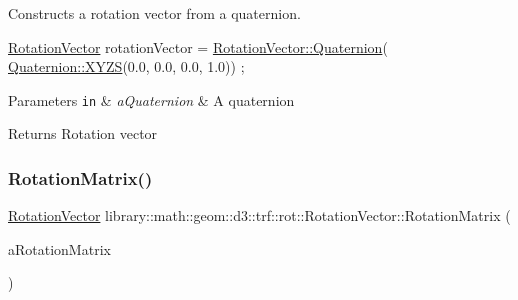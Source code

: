 Constructs a rotation vector from a quaternion. 


\begin{DoxyCode}
\hyperlink{classlibrary_1_1math_1_1geom_1_1d3_1_1trf_1_1rot_1_1_rotation_vector_a49076a279f457fdb14c4a9d4d61e1738}{RotationVector} rotationVector = \hyperlink{classlibrary_1_1math_1_1geom_1_1d3_1_1trf_1_1rot_1_1_rotation_vector_a6da4ed18679e28816896de413e04ed79}{RotationVector::Quaternion}(
      \hyperlink{classlibrary_1_1math_1_1geom_1_1d3_1_1trf_1_1rot_1_1_quaternion_a006294eb483bcfc352c2dc36cf19ceec}{Quaternion::XYZS}(0.0, 0.0, 0.0, 1.0)) ;
\end{DoxyCode}



\begin{DoxyParams}[1]{Parameters}
\mbox{\tt in}  & {\em a\+Quaternion} & A quaternion \\
\hline
\end{DoxyParams}
\begin{DoxyReturn}{Returns}
Rotation vector 
\end{DoxyReturn}
\mbox{\label{classlibrary_1_1math_1_1geom_1_1d3_1_1trf_1_1rot_1_1_rotation_vector_a397807ffe12bb72cd788660b83bdf7b3}} 
\subsubsection{\texorpdfstring{Rotation\+Matrix()}{RotationMatrix()}}
{\footnotesize\ttfamily \hyperlink{classlibrary_1_1math_1_1geom_1_1d3_1_1trf_1_1rot_1_1_rotation_vector}{Rotation\+Vector} library\+::math\+::geom\+::d3\+::trf\+::rot\+::\+Rotation\+Vector\+::\+Rotation\+Matrix (\begin{DoxyParamCaption}\item[{const \hyperlink{classlibrary_1_1math_1_1geom_1_1d3_1_1trf_1_1rot_1_1_rotation_matrix}{rot\+::\+Rotation\+Matrix} \&}]{a\+Rotation\+Matrix }\end{DoxyParamCaption})\hspace{0.3cm}{\ttfamily [static]}}



